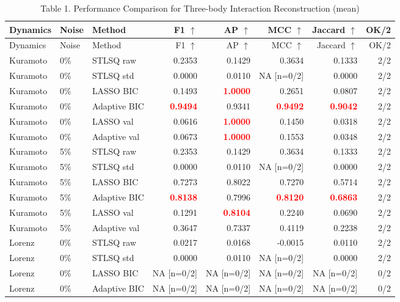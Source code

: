 \documentclass{article}
\begin{document}
\small
\begin{longtable}{lllrrrrr}
\caption{Table 1. Performance Comparison for Three-body Interaction Reconstruction (mean)}\\
\toprule
Dynamics & Noise & Method & F1 $\uparrow$ & AP $\uparrow$ & MCC $\uparrow$ & Jaccard $\uparrow$ & OK/2 \\
\midrule
\endfirsthead
\toprule
Dynamics & Noise & Method & F1 $\uparrow$ & AP $\uparrow$ & MCC $\uparrow$ & Jaccard $\uparrow$ & OK/2 \\
\midrule
\endhead
\bottomrule
\endfoot
Kuramoto & 0\% & STLSQ raw & 0.2353 & 0.1429 & 0.3634 & 0.1333 & 2/2 \\
Kuramoto & 0\% & STLSQ std & 0.0000 & 0.0110 & NA [n=0/2] & 0.0000 & 2/2 \\
Kuramoto & 0\% & LASSO BIC & 0.1493 & \textcolor{red}{\textbf{1.0000}} & 0.2651 & 0.0807 & 2/2 \\
Kuramoto & 0\% & Adaptive BIC & \textcolor{red}{\textbf{0.9494}} & 0.9341 & \textcolor{red}{\textbf{0.9492}} & \textcolor{red}{\textbf{0.9042}} & 2/2 \\
Kuramoto & 0\% & LASSO val & 0.0616 & \textcolor{red}{\textbf{1.0000}} & 0.1450 & 0.0318 & 2/2 \\
Kuramoto & 0\% & Adaptive val & 0.0673 & \textcolor{red}{\textbf{1.0000}} & 0.1553 & 0.0348 & 2/2 \\
\midrule
Kuramoto & 5\% & STLSQ raw & 0.2353 & 0.1429 & 0.3634 & 0.1333 & 2/2 \\
Kuramoto & 5\% & STLSQ std & 0.0000 & 0.0110 & NA [n=0/2] & 0.0000 & 2/2 \\
Kuramoto & 5\% & LASSO BIC & 0.7273 & 0.8022 & 0.7270 & 0.5714 & 2/2 \\
Kuramoto & 5\% & Adaptive BIC & \textcolor{red}{\textbf{0.8138}} & 0.7996 & \textcolor{red}{\textbf{0.8120}} & \textcolor{red}{\textbf{0.6863}} & 2/2 \\
Kuramoto & 5\% & LASSO val & 0.1291 & \textcolor{red}{\textbf{0.8104}} & 0.2240 & 0.0690 & 2/2 \\
Kuramoto & 5\% & Adaptive val & 0.3647 & 0.7337 & 0.4119 & 0.2238 & 2/2 \\
\midrule
Lorenz & 0\% & STLSQ raw & 0.0217 & 0.0168 & -0.0015 & 0.0110 & 2/2 \\
Lorenz & 0\% & STLSQ std & 0.0000 & 0.0110 & NA [n=0/2] & 0.0000 & 2/2 \\
Lorenz & 0\% & LASSO BIC & NA [n=0/2] & NA [n=0/2] & NA [n=0/2] & NA [n=0/2] & 0/2 \\
Lorenz & 0\% & Adaptive BIC & NA [n=0/2] & NA [n=0/2] & NA [n=0/2] & NA [n=0/2] & 0/2 \\

\end{longtable}
\end{document}

